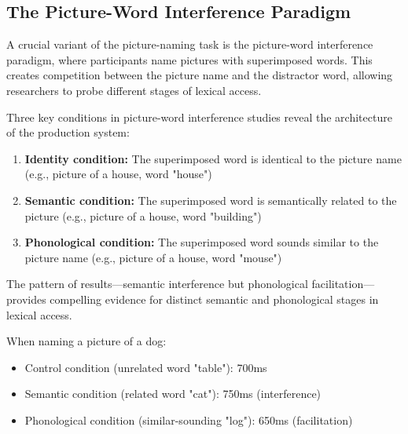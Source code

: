 \documentclass[12pt,a4paper]{article}
\begin{document}
\subsection{The Picture-Word Interference Paradigm}

A crucial variant of the picture-naming task is the picture-word interference paradigm, where participants name pictures with superimposed words. This creates competition between the picture name and the distractor word, allowing researchers to probe different stages of lexical access.

Three key conditions in picture-word interference studies reveal the architecture of the production system:

\begin{enumerate}
\item \textbf{Identity condition:} The superimposed word is identical to the picture name (e.g., picture of a house, word "house")
\item \textbf{Semantic condition:} The superimposed word is semantically related to the picture (e.g., picture of a house, word "building")
\item \textbf{Phonological condition:} The superimposed word sounds similar to the picture name (e.g., picture of a house, word "mouse")
\end{enumerate}

The pattern of results—semantic interference but phonological facilitation—provides compelling evidence for distinct semantic and phonological stages in lexical access.

\begin{tcolorbox}[enhanced, colback=green!5, colframe=green!75!black, title=Experimental Evidence: Semantic Interference vs. Phonological Facilitation]
\begin{center}
\end{center}

When naming a picture of a dog:
\begin{itemize}
\item Control condition (unrelated word "table"): 700ms
\item Semantic condition (related word "cat"): 750ms (interference)
\item Phonological condition (similar-sounding "log"): 650ms (facilitation)
\end{itemize}
\end{tcolorbox}
\end{document}
